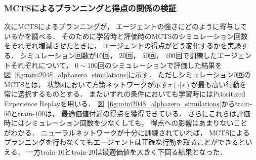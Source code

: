 \subsubsection{MCTSによるプランニングと得点の関係の検証}
次にMCTSによるプランニングが， エージェントの強さにどのように寄与しているかを調べる．
そのために学習時と評価時のMCTSのシミュレーション回数をそれぞれ増減させたときに， エージェントの得点がどう変化するかを実験する．
シミュレーション回数が$10$回， $20$回， $50$回， $100$回で訓練したエージェントそれぞれについて， $0 \sim 100$回のシミュレーションで評価した結果を図~\ref{fig:mini2048_alphazero_simulations}に示す．
ただしシミュレーション$0$回のMCTSとは， 状態$s$において方策ネットワークが示す$\pi(\cdot|s)$が最も高い行動を常に選択するものとする．
またいずれの条件においても学習時にはPrioritized Experience Replayを用いる．
図~\ref{fig:mini2048_alphazero_simulations}からtrain-$50$とtrain-$100$は， 最適価値付近の得点を獲得できている．
さらにこれらは評価時にはシミュレーション回数を少なくしても， 得点への影響はあまりないことがわかる．
ニューラルネットワークが十分に訓練されていれば， MCTSによるプランニングを行わなくてもエージェントは正確な行動を取ることができるといえる．
一方train-$10$とtrain-$20$は最適価値を大きく下回る結果となった．

